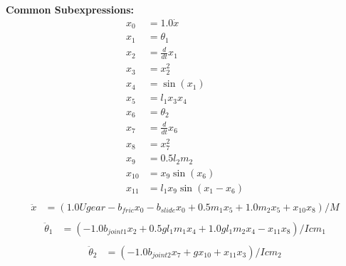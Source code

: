 \documentclass{article}%
\begin{document}
%
\textbf{Common Subexpressions:}\\ \vspace{0.5em}%
\begin{align*}%
x_{0} &= \displaystyle 1.0 \dot{x} \\%
x_{1} &= \displaystyle \theta_1 \\%
x_{2} &= \displaystyle \frac{d}{d t} x_{1} \\%
x_{3} &= \displaystyle x_{2}^{2} \\%
x_{4} &= \displaystyle \sin(x_{1} ) \\%
x_{5} &= \displaystyle l_{1} x_{3} x_{4} \\%
x_{6} &= \displaystyle \theta_2 \\%
x_{7} &= \displaystyle \frac{d}{d t} x_{6} \\%
x_{8} &= \displaystyle x_{7}^{2} \\%
x_{9} &= \displaystyle 0.5 l_{2} m_{2} \\%
x_{10} &= \displaystyle x_{9} \sin(x_{6} ) \\%
x_{11} &= \displaystyle l_{1} x_{9} \sin(x_{1} - x_{6} ) \\%
\end{align*}%
\vspace{1em}%
\begin{align*}%
\ddot{x} &= \displaystyle \left(1.0 U gear - b_{fric} x_{0} - b_{slide} x_{0} + 0.5 m_{1} x_{5} + 1.0 m_{2} x_{5} + x_{10} x_{8}\right) / M \\%
\end{align*}%
\begin{align*}%
\ddot{\theta}_1 &= \displaystyle \left(- 1.0 b_{joint1} x_{2} + 0.5 g l_{1} m_{1} x_{4} + 1.0 g l_{1} m_{2} x_{4} - x_{11} x_{8}\right) / Icm_{1} \\%
\end{align*}%
\begin{align*}%
\ddot{\theta}_2 &= \displaystyle \left(- 1.0 b_{joint2} x_{7} + g x_{10} + x_{11} x_{3}\right) / Icm_{2} \\%
\end{align*}

%
\end{document}
